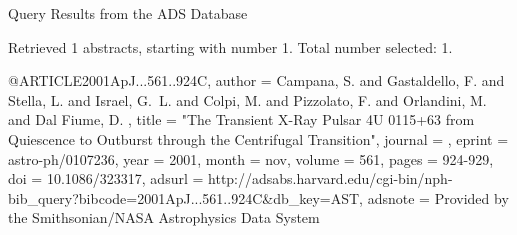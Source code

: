 Query Results from the ADS Database


Retrieved 1 abstracts, starting with number 1.  Total number selected: 1.

@ARTICLE{2001ApJ...561..924C,
   author = {{Campana}, S. and {Gastaldello}, F. and {Stella}, L. and {Israel}, G.~L. and 
	{Colpi}, M. and {Pizzolato}, F. and {Orlandini}, M. and {Dal Fiume}, D.
	},
    title = "{The Transient X-Ray Pulsar 4U 0115+63 from Quiescence to Outburst through the Centrifugal Transition}",
  journal = {\apj},
   eprint = {astro-ph/0107236},
     year = 2001,
    month = nov,
   volume = 561,
    pages = {924-929},
      doi = {10.1086/323317},
   adsurl = {http://adsabs.harvard.edu/cgi-bin/nph-bib_query?bibcode=2001ApJ...561..924C&db_key=AST},
  adsnote = {Provided by the Smithsonian/NASA Astrophysics Data System}
}


